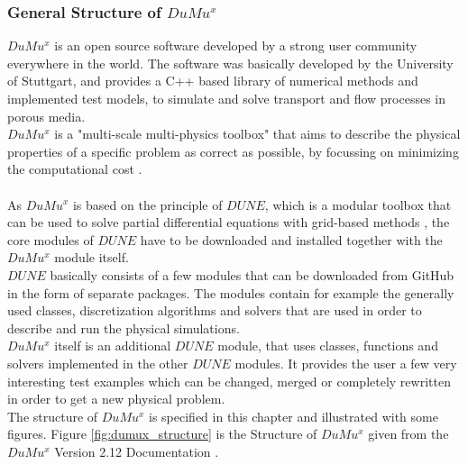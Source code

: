 \newpage
\subsubsection{General Structure of $DuMu^x$}

$DuMu^x$ is an open source software developed by a strong user community everywhere in the world. The software was basically developed by the University of Stuttgart, and provides a C++ based library of numerical methods and implemented test models, to simulate and solve transport and flow processes in porous media.
\\$DuMu^x$ is a "multi-scale multi-physics toolbox" that aims to describe the physical properties of a specific problem as correct as possible, by focussing on minimizing the computational cost  \cite{flemisch2007dumux}.\\
\\As $DuMu^x$ is based on the principle of $DUNE$, which is a modular toolbox that can be used to solve partial differential equations with grid-based methods \cite{flemischdumux}, the core modules of $DUNE$ have to be downloaded and installed together with the $DuMu^x$ module itself.
\\$DUNE$ basically consists of a few modules that can be downloaded from GitHub in the form of separate packages. The modules contain for example the generally used classes, discretization algorithms and solvers that are used in order to describe and run the physical simulations.
\\$DuMu^x$ itself is an additional $DUNE$ module, that uses classes, functions and solvers implemented in the other $DUNE$ modules. It provides the user a few very interesting test examples which can be changed, merged or completely rewritten in order to get a new physical problem.
\\The structure of $DuMu^x$ is specified in this chapter and illustrated with some figures.
Figure \ref{fig:dumux_structure}  is the Structure of $DuMu^x$ given from the $DuMu^x$ Version 2.12 Documentation \cite{flemischdumux}.\\
\\
